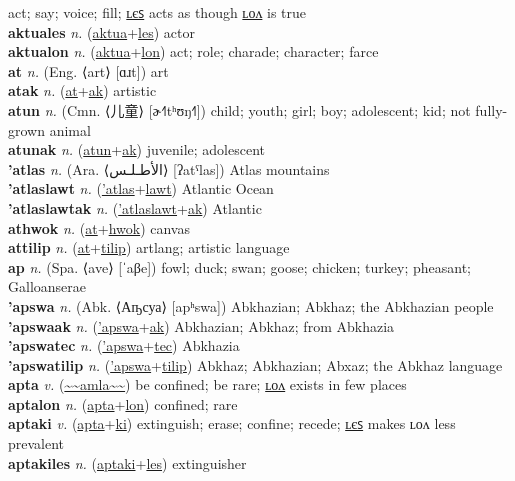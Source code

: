 act; say; voice; fill; \hyperref[aktuales]{ʟєꜱ} acts as though \hyperref[aktualon]{ʟᴏᴧ} is true \label{aktua} \\
\textbf{aktuales} \textit{n.} (\hyperref[aktua]{aktua}+\hyperref[les]{les})
actor \label{aktuales} \\
\textbf{aktualon} \textit{n.} (\hyperref[aktua]{aktua}+\hyperref[lon]{lon})
act; role; charade; character; farce \label{aktualon} \\
\textbf{at} \textit{n.} (Eng. ⟨art⟩ [ɑɹt])
art \label{at} \\
\textbf{atak} \textit{n.} (\hyperref[at]{at}+\hyperref[ak]{ak})
artistic \label{atak} \\
\textbf{atun} \textit{n.} (Cmn. ⟨儿童⟩ [ɚ˧˥tʰʊŋ˧˥])
child; youth; girl; boy; adolescent; kid; not fully-grown animal \label{atun} \\
\textbf{atunak} \textit{n.} (\hyperref[atun]{atun}+\hyperref[ak]{ak})
juvenile; adolescent \label{atunak} \\
\textbf{'atlas} \textit{n.} (Ara. ⟨الأطـلـس‎⟩ [ʔatˤlas])
Atlas mountains \label{'atlas} \\
\textbf{'atlaslawt} \textit{n.} (\hyperref['atlas]{'atlas}+\hyperref[lawt]{lawt})
Atlantic Ocean \label{'atlaslawt} \\
\textbf{'atlaslawtak} \textit{n.} (\hyperref['atlaslawt]{'atlaslawt}+\hyperref[ak]{ak})
Atlantic \label{'atlaslawtak} \\
\textbf{athwok} \textit{n.} (\hyperref[at]{at}+\hyperref[hwok]{hwok})
canvas \label{athwok} \\
\textbf{attilip} \textit{n.} (\hyperref[at]{at}+\hyperref[tilip]{tilip})
artlang; artistic language \label{attilip} \\
\textbf{ap} \textit{n.} (Spa. ⟨ave⟩ [ˈaβe])
fowl; duck; swan; goose; chicken; turkey; pheasant; Galloanserae \label{ap} \\
\textbf{'apswa} \textit{n.} (Abk. ⟨Аҧсуа⟩ [apʰswa])
Abkhazian; Abkhaz; the Abkhazian people \label{'apswa} \\
\textbf{'apswaak} \textit{n.} (\hyperref['apswa]{'apswa}+\hyperref[ak]{ak})
Abkhazian; Abkhaz; from Abkhazia \label{'apswaak} \\
\textbf{'apswatec} \textit{n.} (\hyperref['apswa]{'apswa}+\hyperref[tec]{tec})
Abkhazia \label{'apswatec} \\
\textbf{'apswatilip} \textit{n.} (\hyperref['apswa]{'apswa}+\hyperref[tilip]{tilip})
Abkhaz; Abkhazian; Abxaz; the Abkhaz language \label{'apswatilip} \\
\textbf{apta} \textit{v.} (\hyperref[amla]{\~{}\~{}amla\~{}\~{}})
be confined; be rare; \hyperref[aptalon]{ʟᴏᴧ} exists in few places \label{apta} \\
\textbf{aptalon} \textit{n.} (\hyperref[apta]{apta}+\hyperref[lon]{lon})
confined; rare \label{aptalon} \\
\textbf{aptaki} \textit{v.} (\hyperref[apta]{apta}+\hyperref[ki]{ki})
extinguish; erase; confine; recede; \hyperref[aptakiles]{ʟєꜱ} makes ʟᴏᴧ less prevalent \label{aptaki} \\
\textbf{aptakiles} \textit{n.} (\hyperref[aptaki]{aptaki}+\hyperref[les]{les})
extinguisher \label{aptakiles} \\
